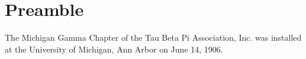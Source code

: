 \documentclass[constitution,final,withoutpreface,withoutoptional,11pt]{../bylaws}
\begin{document}
\frontmatter
\maketitle
\setcounter{tocdepth}{0}
\tableofcontents
\newpage
\mainmatter
\chapter*{Preamble}
The Michigan Gamma Chapter of the Tau Beta Pi Association, Inc. was installed at the University of Michigan, Ann Arbor on June 14, 1906. 








\end{document}
